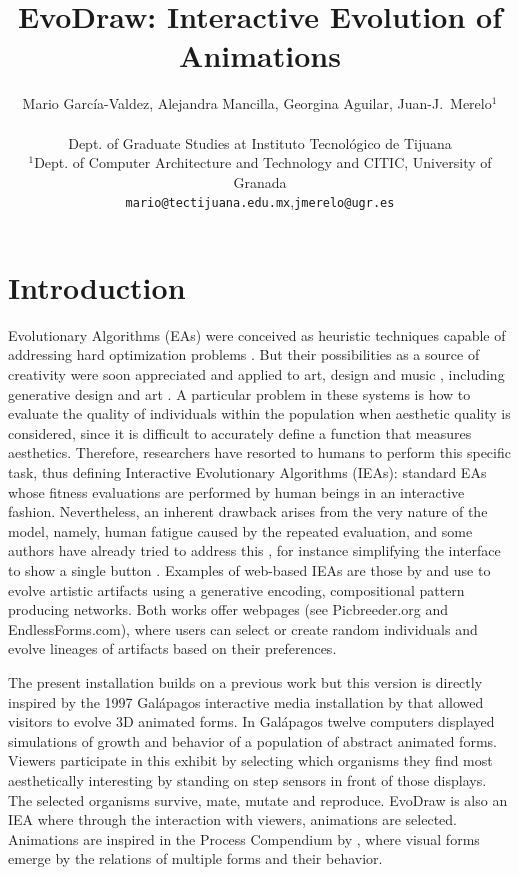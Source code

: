 \documentclass[letterpaper]{article}
\title{EvoDraw: Interactive Evolution of Animations}
\author{ Mario Garc\'ia-Valdez, Alejandra Mancilla, Georgina Aguilar, Juan-J.~Merelo$^1$\\
\mbox{}\\
Dept. of Graduate Studies at Instituto Tecnol\'ogico de Tijuana \\
$^1$Dept. of Computer Architecture and Technology and CITIC, 
University of Granada \\
{\tt mario@tectijuana.edu.mx},{\tt jmerelo@ugr.es}}
\begin{document}
\maketitle


\section{Introduction} 

Evolutionary Algorithms (EAs) were conceived as heuristic techniques 
capable of addressing hard optimization problems 
\citep{DBLP:books/daglib/0015527}. But their possibilities as a source of
creativity were soon appreciated and applied to art, design and music \citep{ie1}, including generative design and
art \citep{Bentley:1999:intro,Sims:1991,todd:1992}.  A particular problem in
these systems is how to evaluate the quality of individuals within the population
when aesthetic quality is considered, since it is difficult to
accurately define a function that measures aesthetics. Therefore, researchers
have resorted to humans to perform this specific task, thus defining Interactive
Evolutionary Algorithms (IEAs): standard EAs whose fitness evaluations are
performed by human beings in an interactive fashion. 
Nevertheless, an inherent drawback arises from the very nature of the model,
namely, human fatigue caused by the repeated evaluation, and some authors have
already tried to address this \citep{Frade:2010:EvoGAMES}, for instance simplifying the interface to show a single button \cite{Davies2016}. %
Examples of web-based IEAs are
those by \cite{picbreeder} and \cite{forms}
use  to evolve artistic artifacts using a generative encoding, compositional
pattern producing networks. Both works offer webpages (see Picbreeder.org and
EndlessForms.com), where users can select or create random individuals and
evolve lineages of artifacts based on their preferences.

The present installation builds on a previous work \citep{garcia2013evospace}
but this version is directly inspired by the 1997 Galápagos interactive 
media installation by \cite{galapagos} that allowed visitors to evolve 3D animated forms. 
In Gal{\'a}pagos twelve computers displayed simulations of growth and 
behavior of a population of abstract animated forms. Viewers
participate in this exhibit by selecting which organisms they find
most aesthetically interesting by standing on step sensors in front 
of those displays. The selected organisms survive, mate, mutate and 
reproduce. EvoDraw is also an IEA where through the interaction
with viewers, animations are selected. Animations are inspired in 
the Process Compendium by \cite{reas:2004}, where visual forms 
emerge by the relations of multiple forms and their behavior. 
\end{document}
